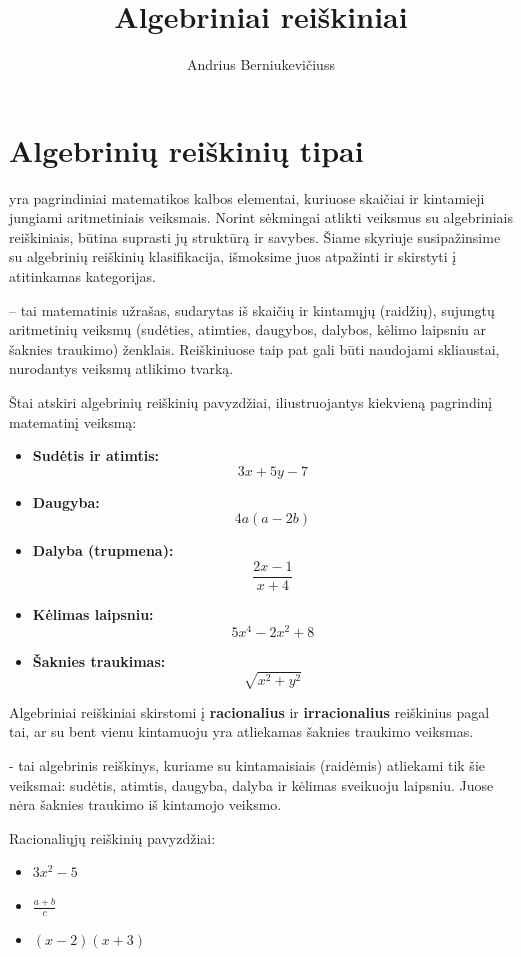 \documentclass[11pt,a4paper]{scrartcl}
\title{Algebriniai reiškiniai}
\author{Andrius Berniukevičiuss}
\begin{document}
\maketitle


\section{Algebrinių reiškinių tipai}
 yra pagrindiniai matematikos kalbos elementai, kuriuose skaičiai ir 
kintamieji jungiami aritmetiniais veiksmais. Norint sėkmingai atlikti veiksmus su algebriniais reiškiniais, 
būtina suprasti jų struktūrą ir savybes. Šiame skyriuje susipažinsime 
su algebrinių reiškinių klasifikacija, išmoksime juos atpažinti ir skirstyti į atitinkamas kategorijas.


\begin{definition}
     – tai matematinis užrašas, sudarytas iš skaičių ir kintamųjų (raidžių), sujungtų aritmetinių veiksmų (sudėties, atimties, daugybos, dalybos, kėlimo laipsniu ar šaknies traukimo) ženklais. Reiškiniuose taip pat gali būti naudojami skliaustai, nurodantys veiksmų atlikimo tvarką.
\end{definition}

\begin{example}
Štai atskiri algebrinių reiškinių pavyzdžiai, iliustruojantys kiekvieną pagrindinį matematinį veiksmą:
\begin{itemize}
    \item \textbf{Sudėtis ir atimtis:} 
    \[ 3x + 5y - 7 \]
    
    \item \textbf{Daugyba:} 
    \[ 4a(a - 2b) \]
    
    \item \textbf{Dalyba (trupmena):} 
    \[ \frac{2x - 1}{x + 4} \]
    
    \item \textbf{Kėlimas laipsniu:} 
    \[ 5x^4 - 2x^2 + 8 \]
    
    \item \textbf{Šaknies traukimas:} 
    \[ \sqrt{x^2 + y^2} \]
\end{itemize}
\end{example}

Algebriniai reiškiniai skirstomi į \textbf{racionalius} ir \textbf{irracionalius} reiškinius pagal tai, ar su bent vienu kintamuoju yra atliekamas šaknies traukimo veiksmas.
\begin{definition}
     - tai algebrinis reiškinys, kuriame su kintamaisiais (raidėmis) atliekami tik šie veiksmai: sudėtis, atimtis, daugyba, dalyba ir kėlimas sveikuoju laipsniu. Juose nėra šaknies traukimo iš kintamojo veiksmo.
\end{definition}
\begin{example}
Racionaliųjų reiškinių pavyzdžiai:
    \begin{itemize}
        \item $3x ^{2} -5$
        \item $\frac{a+b}{c} $
        \item $(x-2)(x+3)$ 
    \end{itemize}
\end{example}
\end{document}
